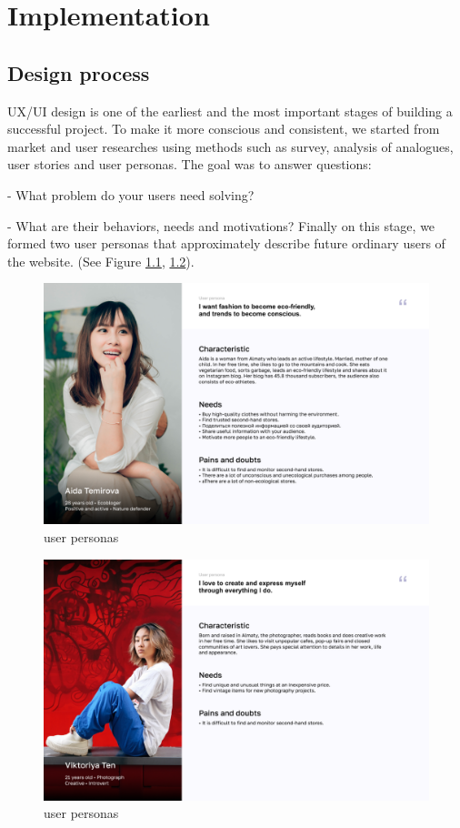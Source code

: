 \chapter{Implementation}\label{ch:C}
\section{Design process}
UX/UI design is one of the earliest and the most important stages of building a successful project. To make it more conscious and consistent, we started from market and user researches using methods such as survey, analysis of analogues, user stories and user personas. The goal was to answer questions:

- What problem do your users need solving?

- What are their behaviors, needs and motivations?
Finally on this stage, we formed two user personas that approximately describe future ordinary users of the website. (See Figure \ref{fig:image001}, \ref{fig:image003}).
\begin{figure}[h]
    \centering
    \includegraphics[scale=0.22]{figures/image001.png}
    \caption{user personas}
    \label{fig:image001}
\end{figure}
\begin{figure}[t!]
    \centering
    \includegraphics[scale=0.22]{figures/image003.png}
    \caption{user personas}
    \label{fig:image003}
\end{figure}

